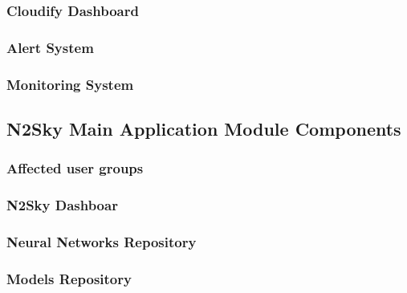 \subsubsection{Cloudify Dashboard}\label{Cloudify Dashboard}
\subsubsection{Alert System}\label{Alerting System}
\subsubsection{Monitoring System}\label{Monitoring System}

\subsection{N2Sky Main Application Module Components}\label{N2Sky Components}
\subsubsection{Affected user groups}\label{Affected user groups 2}
\subsubsection{N2Sky Dashboar}\label{N2Sky Dashboar}
\subsubsection{Neural Networks Repository}\label{Neural Networks Repository}
\subsubsection{Models Repository}\label{Models Repository}
